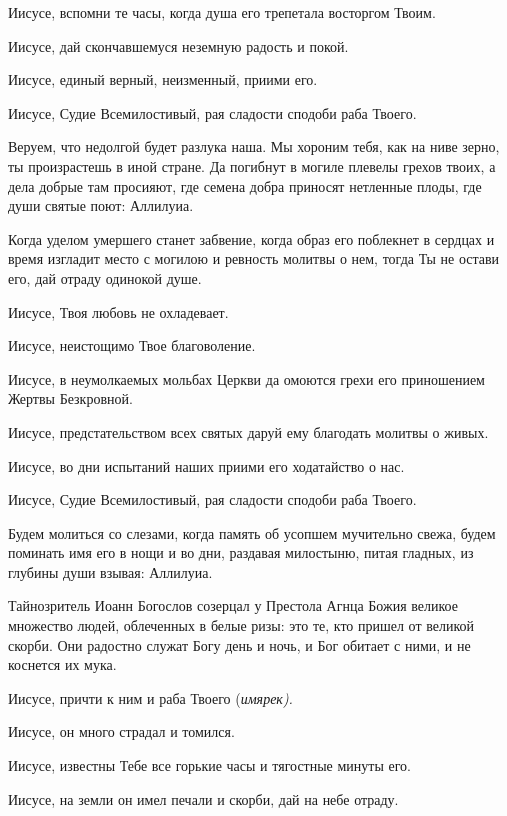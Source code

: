 Иисусе, вспомни те часы, когда душа его трепетала восторгом Твоим. 

Иисусе, дай скончавшемуся неземную радость и покой. 

Иисусе, единый верный, неизменный, приими его. 

Иисусе, Судие Всемилостивый, рая сладости сподоби раба Твоего.




Веруем, что недолгой будет разлука наша. Мы хороним тебя, как на ниве зерно, ты произрастешь в иной стране. Да погибнут в могиле плевелы грехов твоих, а дела добрые там просияют, где семена добра приносят нетленные плоды, где души святые поют: Аллилуиа.




Когда уделом умершего станет забвение, когда образ его поблекнет в сердцах и время изгладит место с могилою и ревность молитвы о нем, тогда Ты не остави его, дай отраду одинокой душе. 

Иисусе, Твоя любовь не охладевает. 

Иисусе, неистощимо Твое благоволение. 

Иисусе, в неумолкаемых мольбах Церкви да омоются грехи его приношением Жертвы Безкровной. 

Иисусе, предстательством всех святых даруй ему благодать молитвы о живых. 

Иисусе, во дни испытаний наших приими его ходатайство о нас. 

Иисусе, Судие Всемилостивый, рая сладости сподоби раба Твоего.




Будем молиться со слезами, когда память об усопшем мучительно свежа, будем поминать имя его в нощи и во дни, раздавая милостыню, питая гладных, из глубины души взывая: Аллилуиа.




Тайнозритель Иоанн Богослов созерцал у Престола Агнца Божия великое множество людей, облеченных в белые ризы: это те, кто пришел от великой скорби. Они радостно служат Богу день и ночь, и Бог обитает с ними, и не коснется их мука. 

Иисусе, причти к ним и раба Твоего (\itshape имярек\normalfont{}). 

Иисусе, он много страдал и томился. 

Иисусе, известны Тебе все горькие часы и тягостные минуты его. 

Иисусе, на земли он имел печали и скорби, дай на небе отраду. 

